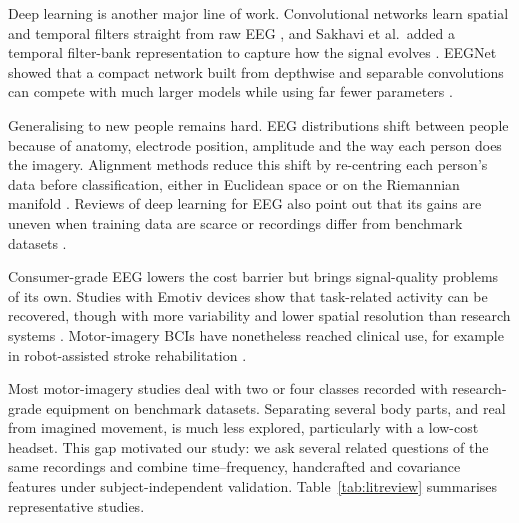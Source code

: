 \documentclass[pdflatex,sn-mathphys-num]{sn-jnl}%
\theoremstyle{thmstyleone}%
\theoremstyle{thmstyletwo}%
\theoremstyle{thmstylethree}%
\begin{document}
Deep learning is another major line of work. Convolutional networks learn spatial and temporal filters straight from raw EEG \citep{Schirrmeister2017}, and Sakhavi et al.\ added a temporal filter-bank representation to capture how the signal evolves \citep{Sakhavi2018}. EEGNet showed that a compact network built from depthwise and separable convolutions can compete with much larger models while using far fewer parameters \citep{Lawhern2018}.

Generalising to new people remains hard. EEG distributions shift between people because of anatomy, electrode position, amplitude and the way each person does the imagery. Alignment methods reduce this shift by re-centring each person's data before classification, either in Euclidean space \citep{He2020} or on the Riemannian manifold \citep{Zanini2018,Zhang2020}. Reviews of deep learning for EEG also point out that its gains are uneven when training data are scarce or recordings differ from benchmark datasets \citep{Roy2019,Altaheri2023}.

Consumer-grade EEG lowers the cost barrier but brings signal-quality problems of its own. Studies with Emotiv devices show that task-related activity can be recovered, though with more variability and lower spatial resolution than research systems \citep{Badcock2013,Duvinage2013,Maskeliunas2016}. Motor-imagery BCIs have nonetheless reached clinical use, for example in robot-assisted stroke rehabilitation \citep{Ang2015}.

Most motor-imagery studies deal with two or four classes recorded with research-grade equipment on benchmark datasets. Separating several body parts, and real from imagined movement, is much less explored, particularly with a low-cost headset. This gap motivated our study: we ask several related questions of the same recordings and combine time--frequency, handcrafted and covariance features under subject-independent validation. Table~\ref{tab:litreview} summarises representative studies.
\end{document}
